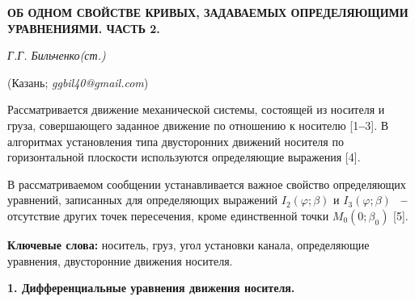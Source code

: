\begin{center}
    {\bf  ОБ  ОДНОМ  СВОЙСТВЕ  КРИВЫХ,
ЗАДАВАЕМЫХ  ОПРЕДЕЛЯЮЩИМИ  УРАВНЕНИЯМИ.
ЧАСТЬ  2.}

    {\it  Г.Г.  Бильченко(ст.)}

    (Казань;  {\it  ggbil40@gmail.com})
\end{center}




    Рассматривается движение
механической системы,
состоящей из носителя и груза,
совершающего заданное движение
по отношению к носителю
[1{\textbf{--}}3].
В алгоритмах установления типа
двусторонних движений носителя
по горизонтальной плоскости
используются определяющие выражения
[4].



    В рассматриваемом сообщении
устанавливается важное свойство
определяющих уравнений,
записанных для определяющих выражений
$I_{2}\left(\varphi; \beta\right)$
и
$I_{3}\left(\varphi; \beta\right)$%
~{\textbf{--}}
отсутствие других точек пересечения,
кроме единственной точки
$\displaystyle
M_{0}\left(
  0; \beta_{0}
  \right)$
[5].



    \textbf{Ключевые слова:}
носитель,
груз,
угол установки канала,
определяющие уравнения,
двусторонние движения носителя.




\textbf{1. Дифференциальные уравнения
движения носителя.}\nopagebreak


